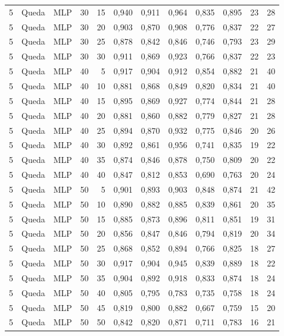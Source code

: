 \begin{longtable}{@{}rllrrrrrrrrr@{}}
5 & Queda & MLP & 30 & 15 & 0,940 & 0,911 & 0,964 & 0,835 & 0,895 & 23 & 28 \\
5 & Queda & MLP & 30 & 20 & 0,903 & 0,870 & 0,908 & 0,776 & 0,837 & 22 & 27 \\
5 & Queda & MLP & 30 & 25 & 0,878 & 0,842 & 0,846 & 0,746 & 0,793 & 23 & 29 \\
5 & Queda & MLP & 30 & 30 & 0,911 & 0,869 & 0,923 & 0,766 & 0,837 & 22 & 23 \\
5 & Queda & MLP & 40 & 5 & 0,917 & 0,904 & 0,912 & 0,854 & 0,882 & 21 & 40 \\
5 & Queda & MLP & 40 & 10 & 0,881 & 0,868 & 0,849 & 0,820 & 0,834 & 21 & 40 \\
5 & Queda & MLP & 40 & 15 & 0,895 & 0,869 & 0,927 & 0,774 & 0,844 & 21 & 28 \\
5 & Queda & MLP & 40 & 20 & 0,881 & 0,860 & 0,882 & 0,779 & 0,827 & 21 & 28 \\
5 & Queda & MLP & 40 & 25 & 0,894 & 0,870 & 0,932 & 0,775 & 0,846 & 20 & 26 \\
5 & Queda & MLP & 40 & 30 & 0,892 & 0,861 & 0,956 & 0,741 & 0,835 & 19 & 22 \\
5 & Queda & MLP & 40 & 35 & 0,874 & 0,846 & 0,878 & 0,750 & 0,809 & 20 & 22 \\
5 & Queda & MLP & 40 & 40 & 0,847 & 0,812 & 0,853 & 0,690 & 0,763 & 20 & 24 \\
5 & Queda & MLP & 50 & 5 & 0,901 & 0,893 & 0,903 & 0,848 & 0,874 & 21 & 42 \\
5 & Queda & MLP & 50 & 10 & 0,890 & 0,882 & 0,885 & 0,839 & 0,861 & 20 & 35 \\
5 & Queda & MLP & 50 & 15 & 0,885 & 0,873 & 0,896 & 0,811 & 0,851 & 19 & 31 \\
5 & Queda & MLP & 50 & 20 & 0,856 & 0,847 & 0,846 & 0,794 & 0,819 & 20 & 34 \\
5 & Queda & MLP & 50 & 25 & 0,868 & 0,852 & 0,894 & 0,766 & 0,825 & 18 & 27 \\
5 & Queda & MLP & 50 & 30 & 0,917 & 0,904 & 0,945 & 0,839 & 0,889 & 18 & 22 \\
5 & Queda & MLP & 50 & 35 & 0,904 & 0,892 & 0,918 & 0,833 & 0,874 & 18 & 24 \\
5 & Queda & MLP & 50 & 40 & 0,805 & 0,795 & 0,783 & 0,735 & 0,758 & 18 & 24 \\
5 & Queda & MLP & 50 & 45 & 0,819 & 0,800 & 0,882 & 0,667 & 0,759 & 15 & 20 \\
5 & Queda & MLP & 50 & 50 & 0,842 & 0,820 & 0,871 & 0,711 & 0,783 & 16 & 21 \\

\end{longtable}
